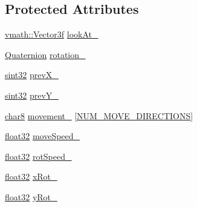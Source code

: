 \subsection*{Protected Attributes}
\begin{DoxyCompactItemize}
\item 
\hyperlink{classvmath_1_1Vector3f}{vmath::Vector3f} \hyperlink{classicee_1_1engine_1_1CameraSceneNode_a00597c8ba8fc79c1bb808c64203c1da7}{lookAt\_\-}
\item 
\hyperlink{classicee_1_1engine_1_1Quaternion}{Quaternion} \hyperlink{classicee_1_1engine_1_1CameraSceneNode_a76cea9ace1709b595c18c00a62c99ccf}{rotation\_\-}
\item 
\hyperlink{namespacecompatibility_afc3ea6dfbdda98c9d2615b235b140a18}{sint32} \hyperlink{classicee_1_1engine_1_1CameraSceneNode_af34e0abb4aced603e5bc3cc1aa478f77}{prevX\_\-}
\item 
\hyperlink{namespacecompatibility_afc3ea6dfbdda98c9d2615b235b140a18}{sint32} \hyperlink{classicee_1_1engine_1_1CameraSceneNode_a6689e5b044be84a1537526497eb9da25}{prevY\_\-}
\item 
\hyperlink{namespacecompatibility_a451d9cfd3da606a663aa298356f0b5a5}{char8} \hyperlink{classicee_1_1engine_1_1CameraSceneNode_abe8f42a5901d3c4483fe8a992ba49579}{movement\_\-} \mbox{[}\hyperlink{classicee_1_1engine_1_1ICameraSceneNode_aeb9040df9d774467ed2a8c82b0f434d6}{NUM\_\-MOVE\_\-DIRECTIONS}\mbox{]}
\item 
\hyperlink{namespacecompatibility_a32a2d006ac2172c0f859370287f0104c}{float32} \hyperlink{classicee_1_1engine_1_1CameraSceneNode_a54660e34759b36a182c21df9e3d1154e}{moveSpeed\_\-}
\item 
\hyperlink{namespacecompatibility_a32a2d006ac2172c0f859370287f0104c}{float32} \hyperlink{classicee_1_1engine_1_1CameraSceneNode_a2b27e6aae2a4cd1868aeb1a274636d8b}{rotSpeed\_\-}
\item 
\hyperlink{namespacecompatibility_a32a2d006ac2172c0f859370287f0104c}{float32} \hyperlink{classicee_1_1engine_1_1CameraSceneNode_a88594483a4aa500a2ced3781a2179e78}{xRot\_\-}
\item 
\hyperlink{namespacecompatibility_a32a2d006ac2172c0f859370287f0104c}{float32} \hyperlink{classicee_1_1engine_1_1CameraSceneNode_a47c1195747ae82d087fb380fce092dbd}{yRot\_\-}
\end{DoxyCompactItemize}


